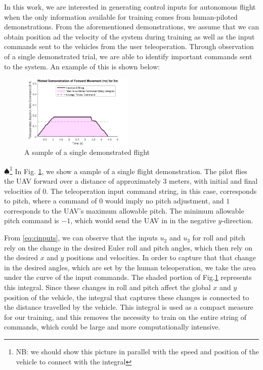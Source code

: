 \documentclass[letterpaper, 10 pt, conference]{ieeeconf}  %
\newcommand\NB[1]{$\spadesuit$\footnote{NB: #1}}
\begin{document}
In this work, we are interested in generating control inputs for autonomous flight when the only information available for training comes from human-piloted demonstrations. From the aforementioned demonstrations, we assume that we can obtain position ad the velocity of the system during training as well as the input commands sent to the vehicles from the user teleoperation.
Through observation of a single demonstrated trial, we are able to identify important commands sent to the system. An example of this is shown below:

\begin{figure}[ht]
    \includegraphics[width=0.48\textwidth]{images/sampleintegral.png}
    \caption{A sample of a single demonstrated flight}
    \label{fig:sampleintegral}
\end{figure}
\NB{we should show this picture in parallel with the speed and position of the vehicle to connect with the integral}
In Fig. \ref{fig:sampleintegral}, we show a sample of a single flight demonstration. The pilot flies the UAV forward over a distance of approximately $3$ meters, with initial and final velocities of $0$. The teleoperation input command string, in this case, corresponds to pitch, where a command of $0$ would imply no pitch adjustment, and $1$ corresponds to the UAV's maximum allowable pitch. The minimum allowable pitch command is $-1$, which would send the UAV in in the negative $y$-direction. 


From \eqref{eq:cinputs}, we can observe that the inputs $u_2$ and $u_3$ for roll and pitch rely on the change in the desired Euler roll and pitch angles, which then rely on the desired $x$ and $y$ positions and velocities. In order to capture that that change in the desired angles, which are set by the human teleoperation, we take the area under the curve of the input commands. The shaded portion of Fig.\ref{fig:sampleintegral} represents this integral. Since these changes in roll and pitch affect the global $x$ and $y$ position of the vehicle, the integral that captures these changes is connected to the distance travelled by the vehicle. This integral is used as a compact measure for our training, and this removes the necessity to train on the entire string of commands, which could be large and more computationally intensive. 
\end{document}
